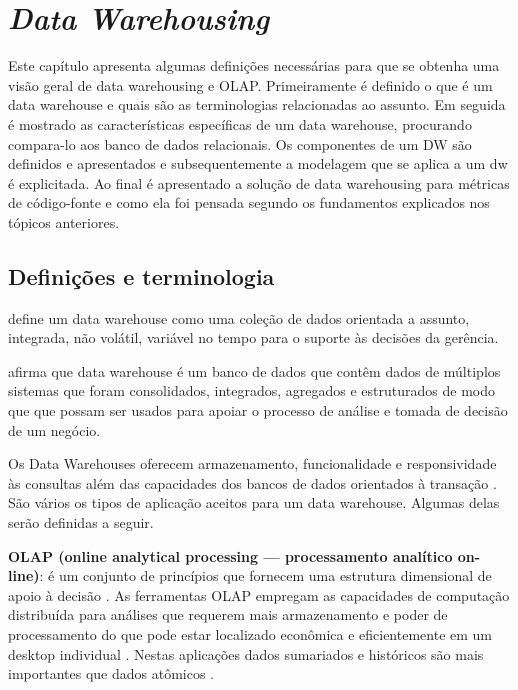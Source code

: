 \chapter{\textit{Data Warehousing}} 
\label{chap:dw}

	Este capítulo apresenta algumas definições necessárias para que se obtenha uma visão geral de data warehousing e OLAP. Primeiramente é definido o que é um data warehouse e quais são as terminologias relacionadas ao assunto. Em seguida é mostrado as características específicas de um data warehouse, procurando compara-lo aos banco de dados relacionais. Os componentes de um DW são definidos e apresentados e subsequentemente a modelagem que se aplica a um dw é explicitada. Ao final é apresentado a solução de data warehousing para métricas de código-fonte e como ela foi pensada segundo os fundamentos explicados nos tópicos anteriores.

\section{Definições e terminologia}\label{sec:intro}

 define um data warehouse como uma coleção de dados orientada a assunto, integrada, não volátil, variável no tempo para o suporte às decisões da gerência.

 afirma que data warehouse é um banco de dados que contêm dados de múltiplos sistemas que foram consolidados, integrados, agregados e estruturados de modo que que possam ser usados para apoiar o processo de análise e tomada de decisão de um negócio.
 
Os Data Warehouses oferecem armazenamento, funcionalidade e responsividade às consultas além das capacidades dos bancos de dados orientados à transação \cite{elmasri_sistemas_2011}. São vários os tipos de aplicação aceitos para um data warehouse. Algumas delas serão definidas a seguir.


\textbf{OLAP (online analytical processing — processamento analítico on-line)}:
é um conjunto de princípios que fornecem uma estrutura dimensional de apoio à decisão \cite{Kimball2002}. As ferramentas OLAP empregam as capacidades de computação distribuída para análises que requerem mais armazenamento e poder de processamento do que pode estar localizado econômica e eficientemente em um desktop individual \cite{elmasri_sistemas_2011}. Nestas aplicações dados sumariados e históricos são mais importantes que dados atômicos \cite{hilmer2002}.

